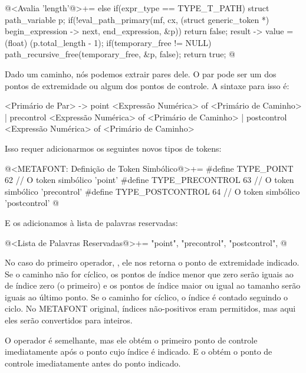 {\iniciocodigo
@<Avalia 'length'@>+=
else if(expr_type == TYPE_T_PATH){
  struct path_variable p;
  if(!eval_path_primary(mf, cx, (struct generic_token *)
                                begin_expression -> next, end_expression,
                                &p))
    return false;
  result -> value = (float) (p.total_length - 1);
  if(temporary_free != NULL)
    path_recursive_free(temporary_free, &p, false);
  return true;
}
@
\fimcodigo


Dado um caminho, nós podemos extrair pares dele. O par pode ser um dos
pontos de extremidade ou algum dos pontos de controle. A sintaxe para
isso é:

\alinhaverbatim
<Primário de Par> -> point <Expressão Numérica> of <Primário de Caminho> |
                     precontrol <Expressão Numérica> of <Primário de Caminho> |
                     postcontrol <Expressão Numérica> of <Primário de Caminho>
\alinhanormal

Isso requer adicionarmos os seguintes novos tipos de tokens:

\iniciocodigo
@<METAFONT: Definição de Token Simbólico@>+=
#define TYPE_POINT             62 // O token simbólico 'point'
#define TYPE_PRECONTROL        63 // O token simbólico 'precontrol'
#define TYPE_POSTCONTROL       64 // O token simbólico 'postcontrol'
@
\fimcodigo

E os adicionamos à lista de palavras reservadas:

\iniciocodigo
@<Lista de Palavras Reservadas@>+=
"point", "precontrol", "postcontrol",
@
\fimcodigo

No caso do primeiro operador, , ele nos retorna o
ponto de extremidade indicado. Se o caminho não for cíclico, os pontos
de índice menor que zero serão iguais ao de índice zero (o primeiro) e
os pontos de índice maior ou igual ao tamanho serão iguais ao último
ponto. Se o caminho for cíclico, o índice é contado seguindo o
ciclo. No METAFONT original, índices não-positivos eram permitidos,
mas aqui eles serão convertidos para inteiros.

O operador  é semelhante, mas ele obtém o
primeiro ponto de controle imediatamente após o ponto cujo índice é
indicado. E o  obtém o ponto de controle
imediatamente antes do ponto indicado.

}
